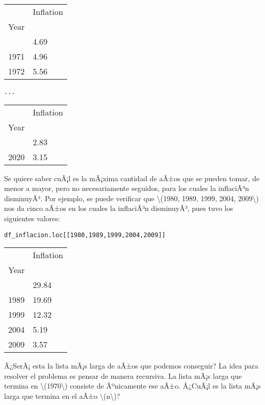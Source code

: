 \begin{longtable}[]{@{}ll@{}}
\toprule\noalign{}
& Inflation \\
Year & \\
\midrule\noalign{}
\endhead
\bottomrule\noalign{}
\endlastfoot
1970 & 4.69 \\
1971 & 4.96 \\
1972 & 5.56 \\
\end{longtable}

\begin{verbatim}
...
\end{verbatim}

\begin{longtable}[]{@{}ll@{}}
\toprule\noalign{}
& Inflation \\
Year & \\
\midrule\noalign{}
\endhead
\bottomrule\noalign{}
\endlastfoot
2019 & 2.83 \\
2020 & 3.15 \\
\end{longtable}

Se quiere saber cuÃ¡l es la mÃ¡xima cantidad de aÃ±os que se pueden
tomar, de menor a mayor, pero no necesariamente seguidos, para los
cuales la inflaciÃ³n disminuyÃ³. Por ejemplo, se puede verificar que
{\textbackslash(1980, 1989, 1999, 2004, 2009\textbackslash)} nos da
cinco aÃ±os en los cuales la inflaciÃ³n disminuyÃ³, pues tuvo los
siguientes valores:

\begin{verbatim}
df_inflacion.loc[[1980,1989,1999,2004,2009]]
\end{verbatim}

\begin{longtable}[]{@{}ll@{}}
\toprule\noalign{}
& Inflation \\
Year & \\
\midrule\noalign{}
\endhead
\bottomrule\noalign{}
\endlastfoot
1980 & 29.84 \\
1989 & 19.69 \\
1999 & 12.32 \\
2004 & 5.19 \\
2009 & 3.57 \\
\end{longtable}

Â¿SerÃ¡ esta la lista mÃ¡s larga de aÃ±os que podemos conseguir? La idea
para resolver el problema es pensar de manera recursiva. La lista mÃ¡s
larga que termina en {\textbackslash(1970\textbackslash)} consiste de
Ãºnicamente ese aÃ±o. Â¿CuÃ¡l es la lista mÃ¡s larga que termina en el
aÃ±o {\textbackslash(n\textbackslash)}?

